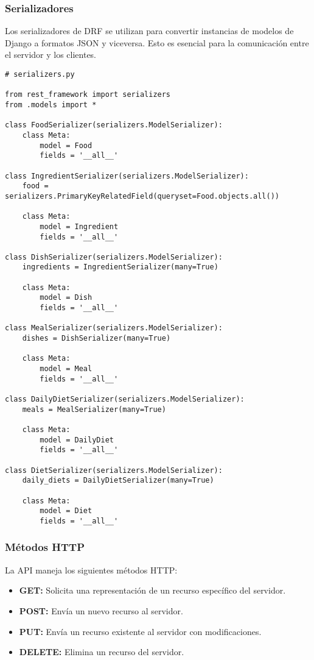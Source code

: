 \subsubsection{Serializadores}
Los serializadores de DRF se utilizan para convertir instancias de modelos de Django a formatos JSON y viceversa. Esto es esencial para la comunicación entre el servidor y los clientes.

\begin{verbatim}
# serializers.py

from rest_framework import serializers
from .models import *

class FoodSerializer(serializers.ModelSerializer):
    class Meta:
        model = Food
        fields = '__all__'

class IngredientSerializer(serializers.ModelSerializer):
    food = serializers.PrimaryKeyRelatedField(queryset=Food.objects.all())
    
    class Meta:
        model = Ingredient
        fields = '__all__'

class DishSerializer(serializers.ModelSerializer):
    ingredients = IngredientSerializer(many=True)
    
    class Meta:
        model = Dish
        fields = '__all__'

class MealSerializer(serializers.ModelSerializer):
    dishes = DishSerializer(many=True)
    
    class Meta:
        model = Meal
        fields = '__all__'

class DailyDietSerializer(serializers.ModelSerializer):
    meals = MealSerializer(many=True)
    
    class Meta:
        model = DailyDiet
        fields = '__all__'

class DietSerializer(serializers.ModelSerializer):
    daily_diets = DailyDietSerializer(many=True)
    
    class Meta:
        model = Diet
        fields = '__all__'
\end{verbatim}

\subsubsection{Métodos HTTP}
La API maneja los siguientes métodos HTTP:
\begin{itemize}
    \item \textbf{GET:} Solicita una representación de un recurso específico del servidor.
    \item \textbf{POST:} Envía un nuevo recurso al servidor.
    \item \textbf{PUT:} Envía un recurso existente al servidor con modificaciones.
    \item \textbf{DELETE:} Elimina un recurso del servidor.
\end{itemize}

